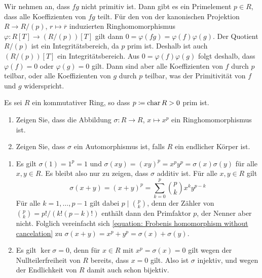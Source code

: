 \begin{solution}
  Wir nehmen an, dass $fg$ nicht primitiv ist.
  Dann gibt es ein Primelement $p \in R$, dass alle Koeffizienten von $fg$ teilt.
  Für den von der kanonischen Projektion $R \to R/(p)$, $r \mapsto \overline{r}$ induzierten Ringhomomorphismus $\varphi \colon R[T] \to (R/(p))[T]$ gilt dann $0 = \varphi(fg) = \varphi(f) \varphi(g)$.
  Der Quotient $R/(p)$ ist ein Integritätsbereich, da $p$ prim ist.
  Deshalb ist auch $(R/(p))[T]$ ein Integritätsbereich.
  Aus $0 = \varphi(f) \varphi(g)$ folgt deshalb, dass $\varphi(f) = 0$ oder $\varphi(g) = 0$ gilt.
  Dann sind aber alle Koeffizienten von $f$ durch $p$ teilbar, oder alle Koeffizienten von $g$ durch $p$ teilbar, was der Primitivität von $f$ und $g$ widerspricht.
\end{solution}


\begin{question}[subtitle = Der Frobeniushomomorphismus]
  \label{question: the frobenius homomorphism}
  Es sei $R$ ein kommutativer Ring, so dass $p \coloneqq \operatorname{char} R > 0$ prim ist.
  \begin{enumerate}
    \item
      Zeigen Sie, dass die Abbildung $\sigma \colon R \to R$, $x \mapsto x^p$ ein Ringhomomorphismus ist.
    \item
      Zeigen Sie, dass $\sigma$ ein Automorphismus ist, falls $R$ ein endlicher Körper ist.
  \end{enumerate}
\end{question}


\begin{solution}
  \begin{enumerate}
    \item
      Es gilt $\sigma(1) = 1^p = 1$ und $\sigma(xy) = (xy)^p = x^p y^p = \sigma(x) \sigma(y)$ für alle $x, y \in R$.
      Es bleibt also nur zu zeigen, dass $\sigma$ additiv ist.
      Für alle $x, y \in R$ gilt
      \begin{equation}
        \label{equation: Frobenis homomorphism without cancelation}
        \sigma(x+y) = (x+y)^p = \sum_{k=0}^p \binom{p}{k} x^k y^{p-k}
      \end{equation}
      Für alle $k = 1, \dotsc, p-1$ gilt dabei $p \mid \binom{p}{k}$, denn der Zähler von $\binom{p}{k} = p!/(k!(p-k)!)$ enthält dann den Primfaktor $p$, der Nenner aber nicht.
      Folglich vereinfacht sich \eqref{equation: Frobenis homomorphism without cancelation} zu $\sigma(x+y) = x^p + y^p = \sigma(x) + \sigma(y)$.
    \item
      Es gilt $\ker \sigma = 0$, denn für $x \in R$ mit $x^p = \sigma(x) = 0$ gilt wegen der Nullteilerfreiheit von $R$ bereits, dass $x = 0$ gilt.
      Also ist $\sigma$ injektiv, und wegen der Endlichkeit von $R$ damit auch schon bijektiv.
  \end{enumerate}
\end{solution}


